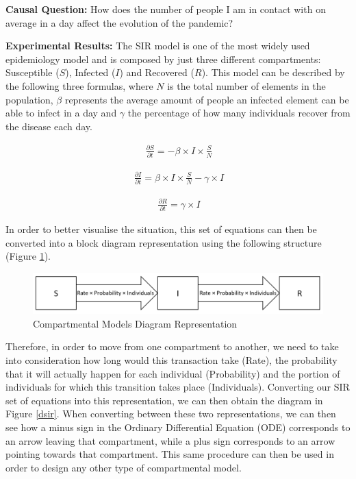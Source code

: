 \textbf{Causal Question:} How does the number of people I am in contact with on average in a day affect the evolution of the pandemic?

\textbf{Experimental Results:} The SIR model is one of the most widely used epidemiology model and is composed by just three different compartments: Susceptible ($S$), Infected ($I$) and Recovered ($R$). This model can be described by the following three formulas, where 
$N$ is the total number of elements in the population, $\beta$ represents the average amount of people an infected element can be able to infect in a day and
$\gamma$ the percentage of how many individuals recover from the disease each day.

\useshortskip
\begin{align}
\ \frac{\partial S}{\partial t} = -\beta \times I \times \frac{S}{N}
\end{align}
\useshortskip

\useshortskip
\begin{align}
\ \frac{\partial I}{\partial t} = \beta \times I \times \frac{S}{N} -\gamma \times I
\end{align}
\useshortskip

\useshortskip
\begin{align}
\ \frac{\partial R}{\partial t} = \gamma \times I
\end{align}
\useshortskip

In order to better visualise the situation, this set of equations can then be converted into a block diagram representation using the following structure (Figure \ref{comp}).

\begin{figure}[ht!]%
    \centering
    \includegraphics[width=0.8\linewidth]{latex/images/comp.pdf}
    \caption{Compartmental Models Diagram Representation}
    \label{comp}
\end{figure}

Therefore, in order to move from one compartment to another, we need to take into consideration how long would this transaction take (Rate), the probability that it will actually happen for each individual (Probability) and the portion of individuals for which this transition takes place (Individuals). Converting our SIR set of equations into this representation, we can then obtain the diagram in Figure \ref{dsir}. When converting between these two representations, we can then see how a minus sign in the Ordinary Differential Equation (ODE) corresponds to an arrow leaving that compartment, while a plus sign corresponds to an arrow pointing towards that compartment. This same procedure can then be used in order to design any other type of compartmental model.

